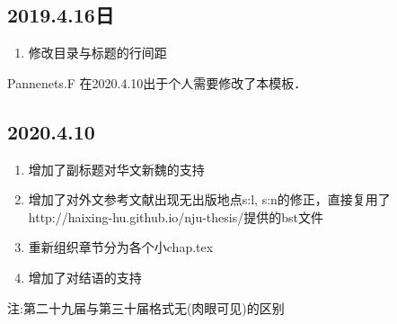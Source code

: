 \subsection{2019.4.16日}
\begin{enumerate}
    \item 修改目录与标题的行间距

\end{enumerate}

Pannenets.F 在2020.4.10出于个人需要修改了本模板．

\subsection{2020.4.10}
\begin{enumerate}
    \item 增加了副标题对华文新魏的支持
    \item 增加了对外文参考文献\cite{ghostnet}出现无出版地点s:l, s:n的修正，直接复用了http://haixing-hu.github.io/nju-thesis/提供的bst文件
    \item 重新组织章节分为各个小chap.tex
    \item 增加了对结语的支持
\end{enumerate}
注:第二十九届与第三十届格式无(肉眼可见)的区别

